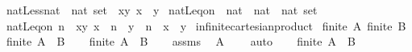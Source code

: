 \begin{isabellebody}
\isamarkupfalse%
\ {\isachardoublequoteopen}{\isacharparenleft}{\kern0pt}natLess{\isacharcolon}{\kern0pt}{\isacharcolon}{\kern0pt}{\isacharparenleft}{\kern0pt}nat\ {\isacharasterisk}{\kern0pt}\ nat{\isacharparenright}{\kern0pt}\ set{\isacharparenright}{\kern0pt}\ {\isasymequiv}\ {\isacharbraceleft}{\kern0pt}{\isacharparenleft}{\kern0pt}x{\isacharcomma}{\kern0pt}y{\isacharparenright}{\kern0pt}{\isachardot}{\kern0pt}\ x\ {\isacharless}{\kern0pt}\ y{\isacharbraceright}{\kern0pt}{\isachardoublequoteclose}\isanewline
\isanewline
{}\isamarkupfalse%
\ natLeq{\isacharunderscore}{\kern0pt}on\ {\isacharcolon}{\kern0pt}{\isacharcolon}{\kern0pt}\ {\isachardoublequoteopen}nat\ {\isasymRightarrow}\ {\isacharparenleft}{\kern0pt}nat\ {\isacharasterisk}{\kern0pt}\ nat{\isacharparenright}{\kern0pt}\ set{\isachardoublequoteclose}\isanewline
{}\ {\isachardoublequoteopen}natLeq{\isacharunderscore}{\kern0pt}on\ n\ {\isasymequiv}\ {\isacharbraceleft}{\kern0pt}{\isacharparenleft}{\kern0pt}x{\isacharcomma}{\kern0pt}y{\isacharparenright}{\kern0pt}{\isachardot}{\kern0pt}\ x\ {\isacharless}{\kern0pt}\ n\ {\isasymand}\ y\ {\isacharless}{\kern0pt}\ n\ {\isasymand}\ x\ {\isasymle}\ y{\isacharbraceright}{\kern0pt}{\isachardoublequoteclose}\isanewline
\isanewline
{}\isamarkupfalse%
\ infinite{\isacharunderscore}{\kern0pt}cartesian{\isacharunderscore}{\kern0pt}product{\isacharcolon}{\kern0pt}\isanewline
{}\ {\isachardoublequoteopen}{\isasymnot}finite\ A{\isachardoublequoteclose}\ {\isachardoublequoteopen}{\isasymnot}finite\ B{\isachardoublequoteclose}\isanewline
{}\ {\isachardoublequoteopen}{\isasymnot}finite\ {\isacharparenleft}{\kern0pt}A\ {\isasymtimes}\ B{\isacharparenright}{\kern0pt}{\isachardoublequoteclose}\isanewline
%
\isadelimproof
%
\endisadelimproof
%
\isatagproof
{}\isamarkupfalse%
\isanewline
\ \ \isamarkupfalse%
\ {\isachardoublequoteopen}finite\ {\isacharparenleft}{\kern0pt}A\ {\isasymtimes}\ B{\isacharparenright}{\kern0pt}{\isachardoublequoteclose}\isanewline
\ \ \isamarkupfalse%
\ assms{\isacharparenleft}{\kern0pt}{}{\isacharparenright}{\kern0pt}\ \isamarkupfalse%
\ {\isachardoublequoteopen}A\ {\isasymnoteq}\ {\isacharbraceleft}{\kern0pt}{\isacharbraceright}{\kern0pt}{\isachardoublequoteclose}\ \isamarkupfalse%
\ auto\isanewline
\ \ \isamarkupfalse%
\ {\isacartoucheopen}finite\ {\isacharparenleft}{\kern0pt}A\ {\isasymtimes}\ B{\isacharparenright}{\kern0pt}{\isacartoucheclose}\ \isamarkupfalse%

\end{isabellebody}
